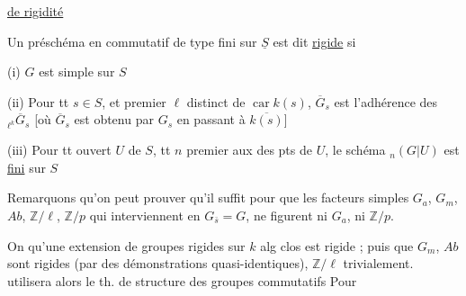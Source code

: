 \uline{ de rigidité}

 Un préschéma en  commutatif  de type fini sur $\underline S$ est dit \uline{rigide} si 

(i) $G$ est  simple sur $S$

(ii) Pour tt $s\in S$, et  premier $\ell$  distinct de $\operatorname{car} k(s)$, $\overline G_s$ est  l'adhérence des $ {}_{\ell^k}\overline G_s$ [où $\overline G_s$ est obtenu par $G_s$ en passant à  $\overline{k(s)}$]

(iii) Pour tt  ouvert $U$ de $S$, tt  $n$ premier aux   des pts de $U$, le schéma $ {}_n(G|U)$ est \uline{fini} sur $S$\unsure{]}

 Remarquons qu'on peut prouver qu'il  suffit pour  que    les facteurs simples $G_a$, $G_m$, $Ab$, $\mathbb Z/\ell$, $\mathbb Z/p$ qui interviennent en $G_{\bar s}=G$, ne figurent ni $G_a$, ni $\mathbb Z/p$. 

  On  qu'une extension de groupes rigides sur $k$ alg clos est rigide ; puis  que $G_m$, $Ab$ sont rigides (par des démonstrations quasi-identiques), $\mathbb Z/\ell$  trivialement.  utilisera alors le th. de structure des groupes commutatifs  Pour 

